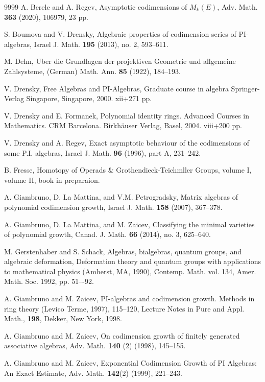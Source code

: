 \documentclass{amsart}
\theoremstyle{definition}
\theoremstyle{remark}
\numberwithin{equation}{section}
\begin{document}
\begin{thebibliography}{9999}
A. Berele and A. Regev, 
Asymptotic codimensions of $M_k(E)$, 
Adv. Math. {\bf 363} (2020), 106979, 23 pp. 

S. Boumova and V. Drensky, 
Algebraic properties of codimension series of PI-algebras, 
Israel J. Math. {\bf 195} (2013), no. 2, 593--611.


M. Dehn, Uber die Grundlagen der projektiven Geometrie und
allgemeine Zahlsysteme, (German) Math. Ann. \textbf{85} (1922), 184--193.
	
V. Drensky, 
Free Algebras and PI-Algebras,
Graduate course in algebra
Springer-Verlag Singapore, Singapore, 2000. xii+271 pp.

	
V. Drensky and E. Formanek, 
Polynomial identity rings. Advanced Courses in Mathematics. 
CRM Barcelona. Birkh{\" a}user Verlag, Basel, 2004. viii+200 pp.
	
	
V. Drensky and A. Regev, 
Exact asymptotic behaviour of the codimensions of some P.I. algebras,
Israel J. Math. {\bf 96} (1996), part A, 231--242.

B. Fresse,
Homotopy of Operads \& Grothendieck-Teichmller Groups,
volume I, volume II, book in preparaion.
	
A. Giambruno, D. La Mattina, and V.M. Petrogradsky, 
Matrix algebras of polynomial codimension growth, 
Israel J. Math. {\bf 158} (2007), 367--378.

A. Giambruno, D. La Mattina, and M. Zaicev, 
Classifying the minimal varieties of polynomial growth, 
Canad. J. Math. {\bf 66} (2014), no. 3, 625--640.
	
	
M. Gerstenhaber and S. Schack,
Algebras, bialgebras, quantum groups, and algebraic
deformation, Deformation theory and quantum groups with applications to mathematical
physics (Amherst, MA, 1990), Contemp. Math. vol. 134, Amer. Math. Soc. 1992, pp. 51–-92.
	
A. Giambruno and M. Zaicev,
PI-algebras and codimension growth.
Methods in ring theory (Levico Terme, 1997), 115--120,
Lecture Notes in Pure and Appl. Math., {\bf 198}, Dekker, New York, 1998.
	
A. Giambruno and M. Zaicev,
On codimension growth of finitely generated associative algebras,
Adv. Math. {\bf 140} (2) (1998), 145--155.
	
A. Giambruno and M. Zaicev,
Exponential Codimension Growth of PI Algebras: An Exact Estimate,
Adv. Math. {\bf 142}(2) (1999),  221--243.
	

\end{thebibliography}
\end{document}
